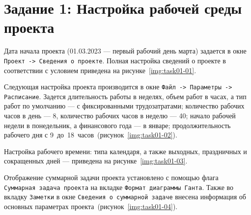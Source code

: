 \section{Задание 1: Настройка рабочей среды проекта}

Дата начала проекта (01.03.2023 --- первый рабочий день марта) задается в окне
\texttt{Проект -> Сведения о проекте}. Полная настройка сведений о проекте в
соответствии с условием приведена на рисунке~\ref{img:task01-01}.


Следующая настройка проекта производится в окне \texttt{Файл -> Параметры ->
Расписание}.  Задется длительность работы в неделях, объем работ в часах, а тип
работ по умолчанию --- с фиксированными трудозатратами; количество рабочих
часов в день --- 8, количество рабочих часов в неделю --- 40; начало рабочей
недели в понедельник, а финансового года --- в январе; продолжительность
рабочего дня с 9~до~18~часов~(рисунок~\ref{img:task01-02}).


Настройка рабочего времени: типа календаря, а также выходных, праздничных и
сокращенных дней --- приведена на рисунке~\ref{img:task01-03}.


Отображение суммарной задачи проекта установлено с помощью флага
\texttt{Суммарная задача проекта} на вкладке \texttt{Формат диаграммы Ганта}.
Также во вкладку \texttt{Заметки} в окне \texttt{Сведения о суммарной задаче}
внесена информация об основных параметрах проекта~(рисунок~\ref{img:task01-04}).

